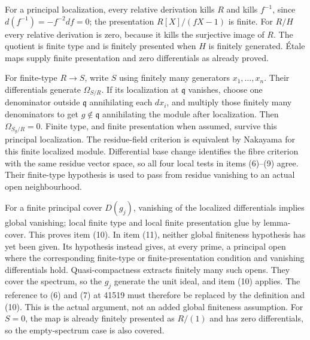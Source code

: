 For a principal localization, every relative derivation kills \(R\) and kills \(f^{-1}\), since \(d(f^{-1})=-f^{-2}df=0\); the presentation \(R[X]/(fX-1)\) is finite. For \(R/H\) every relative derivation is zero, because it kills the surjective image of \(R\). The quotient is finite type and is finitely presented when \(H\) is finitely generated. Étale maps supply finite presentation and zero differentials as already proved.

For finite-type \(R\to S\), write \(S\) using finitely many generators \(x_1,\ldots,x_n\). Their differentials generate \(\Omega_{S/R}\). If its localization at \(\mathfrak q\) vanishes, choose one denominator outside \(\mathfrak q\) annihilating each \(dx_i\), and multiply those finitely many denominators to get \(g\notin\mathfrak q\) annihilating the module after localization. Then \(\Omega_{S_g/R}=0\). Finite type, and finite presentation when assumed, survive this principal localization. The residue-field criterion is equivalent by Nakayama for this finite localized module. Differential base change identifies the fibre criterion with the same residue vector space, so all four local tests in items (6)--(9) agree. Their finite-type hypothesis is used to pass from residue vanishing to an actual open neighbourhood.

For a finite principal cover \(D(g_j)\), vanishing of the localized differentials implies global vanishing; local finite type and local finite presentation glue by lemma-cover. This proves item (10). In item (11), neither global finiteness hypothesis has yet been given. Its hypothesis instead gives, at every prime, a principal open where the corresponding finite-type or finite-presentation condition and vanishing differentials hold. Quasi-compactness extracts finitely many such opens. They cover the spectrum, so the \(g_j\) generate the unit ideal, and item (10) applies. The reference to (6) and (7) at 41519 must therefore be replaced by the definition and (10). This is the actual argument, not an added global finiteness assumption. For \(S=0\), the map is already finitely presented as \(R/(1)\) and has zero differentials, so the empty-spectrum case is also covered.

